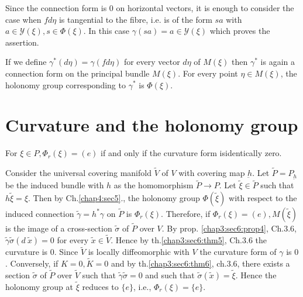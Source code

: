 Since the connection form is $0$ on horizontal vectors, it is enough
to consider the case when $f d \eta$ is tangential to the fibre,
i.e. is of the form $sa$ with $a \in \mathscr{Y}(\xi), s \in
\Phi(\xi)$. In this case $\gamma (sa) = a \in \mathscr{Y} (\xi)$ which
proves the assertion. 

If we define $\gamma^* (d \eta) = \gamma (fd  \eta)$ for every vector
$d \eta$ of $M(\xi)$ then $\gamma^*$ is again a connection form on the
principal bundle $M(\xi)$. For every point $\eta \in M(\xi)$, the
holonomy group corresponding to $\gamma^* $ is $\Phi (\xi)$. 

\section{Curvature and the holonomy group}\label{chap4:sec8}%

\begin{theorem}\label{chap4:sec8:thm5}%
\end{theorem}
For $\xi \in P, \Phi_r (\xi) = (e)$ if and only if the curvature form
is\pageoriginale identically zero. 

Consider the universal covering manifold $\tilde{V}$ of $V$ with
covering map $\underbar{h}$. Let $\tilde{P} = P_{\underbar{h}}$ be the
induced bundle with $h$ as the homomorphism $\tilde{P} \to P$. Let
$\tilde{\xi} \in \tilde{P}$ such that $h \tilde{\xi} = \xi$. Then by
Ch.\ref{chap4:sec5}., the holonomy group $\Phi (\tilde{\xi})$ with respect to the
induced connection $\tilde{\gamma}= h^* \gamma$ on $\tilde{P}$ is
$\Phi_r (\xi)$. Therefore, if $\Phi_r (\xi)= (e), M(\tilde{\xi})$ is the
image of a cross-section $\tilde{\sigma}$ of $\tilde{P}$ over $V$. By
prop. \ref{chap3:sec6:prop4}, Ch.3.6, $\tilde{\gamma}\tilde{\sigma}(d~\tilde{x})=0$ for every
$\tilde{x}\in \tilde{V}$. Hence by th.\ref{chap3:sec6:thm5}, Ch.3.6 the curvature is
0. Since $\tilde{V}$ is locally diffeomorphic with $V$ the
curvature form of $\gamma$ is $0$. Conversely, if $K=0, \tilde{K} =0$
and by th.\ref{chap3:sec6:thm6}, ch.3.6, there exists a section $\tilde{\sigma}$ of
$\tilde{P}$ over $\tilde{V}$ such that $\tilde{\gamma} \tilde{\sigma}=0$ and
such that $\tilde{\sigma}(\tilde{x})= \tilde{\xi}$. Hence the holonomy
group at $\tilde{\xi}$ reduces to $\{ e\}$, i.e., $\Phi_r (\xi) = \{ e
\}$. 

\begin{theorem}\label{chap4:sec8:thm6}%
\end{theorem}

